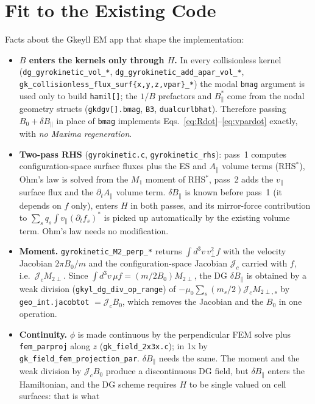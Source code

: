 \documentclass[11pt, letterpaper]{article}
\newcommand{\dBpar}{\delta B_\parallel}
\newcommand{\Bparstar}{B^*_\parallel}
\newcommand{\vpar}{v_\parallel}
\newcommand{\Apar}{A_\parallel}
\newcommand{\code}[1]{\texttt{#1}}
\begin{document}
\section{Fit to the Existing Code}
\label{sec:fit}
Facts about the Gkeyll EM app that shape the implementation:
\begin{itemize}
  \item \textbf{$B$ enters the kernels only through $H$.} In every collisionless kernel
  (\code{dg\_gyrokinetic\_vol\_*}, \code{dg\_gyrokinetic\_add\_apar\_vol\_*},
  \code{gk\_collisionless\_flux\_surf\{x,y,z,vpar\}\_*}) the modal \code{bmag} argument is used
  only to build \code{hamil[]}; the $1/B$ prefactors and $\Bparstar$ come from the nodal geometry
  structs (\code{gkdgv[].bmag}, \code{B3}, \code{dualcurlbhat}). Therefore passing
  $B_0+\dBpar$ in place of \code{bmag} implements Eqs.~\eqref{eq:Rdot}--\eqref{eq:vpardot}
  exactly, with \emph{no Maxima regeneration}.
  \item \textbf{Two-pass RHS} (\code{gyrokinetic.c}, \code{gyrokinetic\_rhs}): pass~1 computes
  configuration-space surface fluxes plus the ES and $\Apar$ volume terms (RHS$^*$), Ohm's law is
  solved from the $M_1$ moment of RHS$^*$, pass~2 adds the $\vpar$ surface flux and the
  $\partial_t\Apar$ volume term. $\dBpar$ is known before pass~1 (it depends on $f$ only), enters
  $H$ in both passes, and its mirror-force contribution to $\sum_s q_s\int\vpar(\partial_t f_s)^*$
  is picked up automatically by the existing volume term. Ohm's law needs no modification.
  \item \textbf{Moment.} \code{gyrokinetic\_M2\_perp\_*} returns $\int d^3v\,v_\perp^2 f$ with the
  velocity Jacobian $2\pi B_0/m$ and the configuration-space Jacobian $\mathcal{J}_c$ carried with
  $f$, i.e.\ $\mathcal{J}_c M_{2\perp}$. Since $\int d^3v\,\mu f = (m/2B_0)M_{2\perp}$, the DG
  $\dBpar$ is obtained by a weak division (\code{gkyl\_dg\_div\_op\_range}) of
  $-\mu_0\sum_s (m_s/2)\mathcal{J}_cM_{2\perp,s}$ by \code{geo\_int.jacobtot} $=\mathcal{J}_cB_0$,
  which removes the Jacobian and the $B_0$ in one operation.
  \item \textbf{Continuity.} $\phi$ is made continuous by the perpendicular FEM solve plus
  \code{fem\_parproj} along $z$ (\code{gk\_field\_2x3x.c}); in 1x by
  \code{gk\_field\_fem\_projection\_par}. $\dBpar$ needs the same. The moment and the weak
  division by $\mathcal{J}_cB_0$ produce a discontinuous DG field, but $\dBpar$ enters the
  Hamiltonian, and the DG scheme requires $H$ to be single valued on cell surfaces: that is what

\end{itemize}
\end{document}
